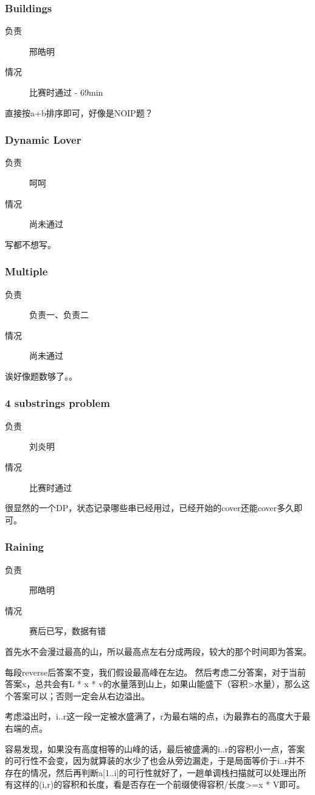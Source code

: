 \documentclass[a4paper, 11pt, nofonts, nocap, fancyhdr]{ctexart}
\newcommand{\problem}[1]{\subsubsection{#1}}
\begin{document}
\problem{Buildings}

\begin{description}
\item[负责] 邢皓明
\item[情况] 比赛时通过 - 69min
\end{description}

直接按a+b排序即可，好像是NOIP题？

\problem{Dynamic Lover}

\begin{description}
\item[负责] 呵呵
\item[情况] 尚未通过
\end{description}

写都不想写。


\problem{Multiple}

\begin{description}
\item[负责] 负责一、负责二
\item[情况] 尚未通过
\end{description}

诶好像题数够了。。

\problem{4 substrings problem}

\begin{description}
\item[负责] 刘炎明
\item[情况] 比赛时通过
\end{description}

很显然的一个DP，状态记录哪些串已经用过，已经开始的cover还能cover多久即可。


\problem{Raining}

\begin{description}
\item[负责] 邢皓明
\item[情况] 赛后已写，数据有错
\end{description}

首先水不会漫过最高的山，所以最高点左右分成两段，较大的那个时间即为答案。

每段reverse后答案不变，我们假设最高峰在左边。
然后考虑二分答案，对于当前答案x，总共会有L * x * v的水量落到山上，如果山能盛下（容积>水量），那么这个答案可以；否则一定会从右边溢出。

考虑溢出时，i..r这一段一定被水盛满了，r为最右端的点，i为最靠右的高度大于最右端的点。

容易发现，如果没有高度相等的山峰的话，最后被盛满的i..r的容积小一点，答案的可行性不会变，因为就算装的水少了也会从旁边漏走，于是局面等价于i..r并不存在的情况，然后再判断a[1..i]的可行性就好了，一趟单调栈扫描就可以处理出所有这样的(i,r)的容积和长度，看是否存在一个前缀使得容积/长度>=x * V即可。
\end{document}
